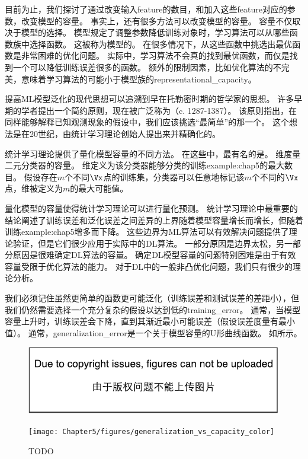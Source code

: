 
目前为止，我们探讨了通过改变输入\gls{feature}的数目，和加入这些\gls{feature}对应的参数，改变模型的容量。
事实上，还有很多方法可以改变模型的容量。
容量不仅取决于模型的选择。
模型规定了调整参数降低训练对象时，学习算法可以从哪些函数族中选择函数。
这被称为模型的。
在很多情况下，从这些函数中挑选出最优函数是非常困难的优化问题。
实际中，学习算法不会真的找到最优函数，而仅是找到一个可以降低训练误差很多的函数。
额外的限制因素，比如优化算法的不完美，意味着学习算法的可能小于模型族的\gls{representational_capacity}。


提高\gls{ML}模型泛化的现代思想可以追溯到早在托勒密时期的哲学家的思想。
许多早期的学者提出一个简约原则，现在被广泛称为（c. 1287-1387）。
该原则指出，在同样能够解释已知观测现象的假设中，我们应该挑选``最简单''的那一个。
这个想法是在20世纪，由统计学习理论创始人提出来并精确化的\citep{Vapnik71,Vapnik82,Blumer-et-al-1989,Vapnik95}。

统计学习理论提供了量化模型容量的不同方法。
在这些中，最有名的是。
维度量二元分类器的容量。
维定义为该分类器能够分类的训练\gls{example:chap5}的最大数目。
假设存在$m$个不同$\Vx$点的训练集，分类器可以任意地标记该$m$个不同的$\Vx$点，维被定义为$m$的最大可能值。

量化模型的容量使得统计学习理论可以进行量化预测。
统计学习理论中最重要的结论阐述了训练误差和泛化误差之间差异的上界随着模型容量增长而增长，但随着训练\gls{example:chap5}增多而下降\citep{Vapnik71,Vapnik82,Blumer-et-al-1989,Vapnik95}。
这些边界为\gls{ML}算法可以有效解决问题提供了理论验证，但是它们很少应用于实际中的\gls{DL}算法。
一部分原因是边界太松，另一部分原因是很难确定\gls{DL}算法的容量。
确定\gls{DL}模型容量的问题特别困难是由于有效容量受限于优化算法的能力。
对于\gls{DL}中的一般非凸优化问题，我们只有很少的理论分析。

我们必须记住虽然更简单的函数更可能泛化（训练误差和测试误差的差距小），但我们仍然需要选择一个充分复杂的假设以达到低的\gls{training_error}。
通常，当模型容量上升时，训练误差会下降，直到其渐近最小可能误差（假设误差度量有最小值）。
通常，\gls{generalization_error}是一个关于模型容量的U形曲线函数。
如所示。

\begin{figure}[!htb]
\ifOpenSource
\centerline{\includegraphics{figure.pdf}}
\else
\centerline{\texttt{[image: Chapter5/figures/generalization\_vs\_capacity\_color]}}
\fi
\caption{TODO}
\label{fig:chap5_generalization_vs_capacity}
\end{figure}

